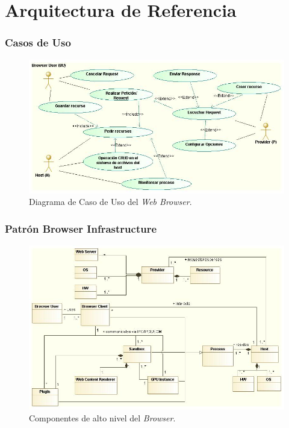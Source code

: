 \documentclass[serif,9pt]{beamer}
\begin{document}
\section{Arquitectura de Referencia}
\begin{frame}
	\frametitle{Casos de Uso}
	\begin{figure}[h]
	    \centering
	    \includegraphics[scale=0.35]{figures/chap4/UCBrowser.jpg}
	    \caption{Diagrama de Caso de Uso del \textit{Web Browser}.}
	    \label{fig:CUBrowser}
	\end{figure}
\end{frame}

\begin{frame}
	\frametitle{Patr\'on Browser Infrastructure}
	\begin{figure}[h]
	    \centering
	    \includegraphics[scale=0.35]{figures/chap4/browserInfraPattern_v3.jpg}
	    \caption{Componentes de alto nivel del \textit{Browser}.}
	    \label{fig:BIPatt}
	\end{figure}
\end{frame}
\end{document}
